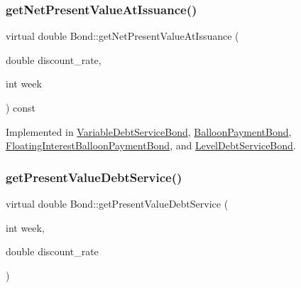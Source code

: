 \mbox{\label{classBond_a5997278813deb16aa5d01bbca8ecc7b2}} 
\subsubsection{\texorpdfstring{get\+Net\+Present\+Value\+At\+Issuance()}{getNetPresentValueAtIssuance()}}
{\footnotesize\ttfamily virtual double Bond\+::get\+Net\+Present\+Value\+At\+Issuance (\begin{DoxyParamCaption}\item[{double}]{discount\+\_\+rate,  }\item[{int}]{week }\end{DoxyParamCaption}) const\hspace{0.3cm}{\ttfamily [pure virtual]}}



Implemented in \mbox{\hyperlink{classVariableDebtServiceBond_a8cc7ee442d788b91b8c00e6bed07644d}{Variable\+Debt\+Service\+Bond}}, \mbox{\hyperlink{classBalloonPaymentBond_abbfaae70e003f057ec842d3889138345}{Balloon\+Payment\+Bond}}, \mbox{\hyperlink{classFloatingInterestBalloonPaymentBond_a90205e26e09eef1227f8c0671ca4fce2}{Floating\+Interest\+Balloon\+Payment\+Bond}}, and \mbox{\hyperlink{classLevelDebtServiceBond_a0f5820c3e76b8b908dbe153a8291d96a}{Level\+Debt\+Service\+Bond}}.

\mbox{\label{classBond_a322d4ab0c0c72824ac4df5df80f14d24}} 
\subsubsection{\texorpdfstring{get\+Present\+Value\+Debt\+Service()}{getPresentValueDebtService()}}
{\footnotesize\ttfamily virtual double Bond\+::get\+Present\+Value\+Debt\+Service (\begin{DoxyParamCaption}\item[{int}]{week,  }\item[{double}]{discount\+\_\+rate }\end{DoxyParamCaption})\hspace{0.3cm}{\ttfamily [pure virtual]}}



